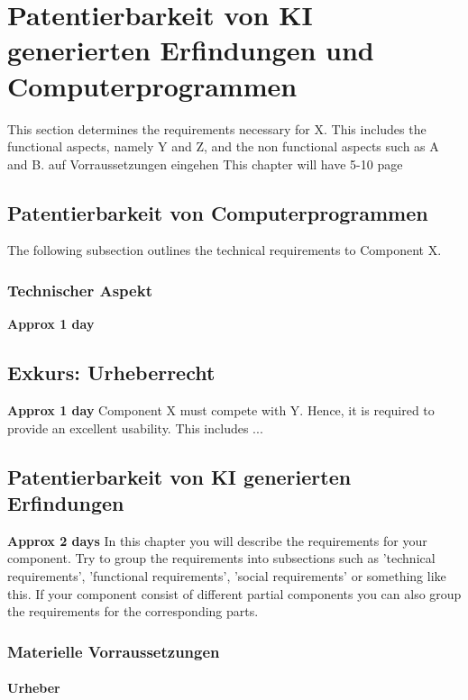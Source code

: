 \chapter{Patentierbarkeit von KI generierten Erfindungen und Computerprogrammen\label{cha:chapter3}}
This section determines the requirements necessary for X. This includes the functional aspects, namely Y and Z, and the non functional aspects such as A and B.
auf Vorraussetzungen eingehen 
This chapter will have 5-10 page
\section{Patentierbarkeit von Computerprogrammen\label{sec:patcom}}


The following subsection outlines the technical requirements to Component X.

\subsection{Technischer Aspekt\label{sec:reqsuba}}

\textbf{Approx 1 day}

\section{Exkurs: Urheberrecht\label{sec:socreq}}

\textbf{Approx 1 day}
Component X must compete with Y. Hence, it is required to provide an excellent usability. This includes ...
\section{Patentierbarkeit von KI generierten Erfindungen\label{sec:reqoverview}}

\textbf{Approx 2 days}
In this chapter you will describe the requirements for your component. Try to group the requirements into subsections such as 'technical requirements', 'functional requirements', 'social requirements' or something like this. If your component consist of different partial components you can also group the requirements for the corresponding parts. 

\subsection{Materielle Vorraussetzungen\label{sec:reqsuba}}

\subsubsection{Urheber}

